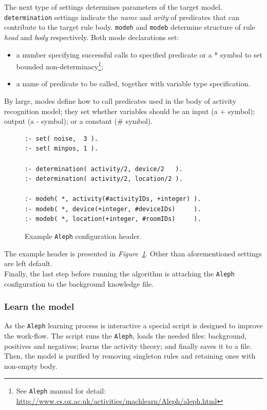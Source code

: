 \documentclass[10pt, a4paper, pdflatex, leqno, twoside, openright]{report}
\begin{document}
The next type of settings determines parameters of the target model. \texttt{determination} settings indicate the \emph{name} and \emph{arity} of predicates that can contribute to the target rule body. \texttt{modeh} and \texttt{modeb} determine structure of rule \emph{head} and \emph{body} respectively. Both mode declarations set:
\begin{itemize}
\item a number specifying successful calls to specified predicate or a * symbol to set bounded non-determinacy\footnote{See \texttt{Aleph} manual for detail: \url{http://www.cs.ox.ac.uk/activities/machlearn/Aleph/aleph.html}};
\item a name of predicate to be called, together with variable type specification.
\end{itemize}
By large, modes define how to call predicates used in the body of activity recognition model; they set whether variables should be an input (a + symbol); output (a - symbol); or a constant (\# symbol).\\

\begin{figure}[htb]
  \begin{verbatim}
:- set( noise,  3 ).
:- set( minpos, 1 ).

:- determination( activity/2, device/2   ).
:- determination( activity/2, location/2 ).

:- modeh( *, activity(#activityIDs, +integer) ).
:- modeb( *, device(+integer, #deviceIDs)     ).
:- modeb( *, location(+integer, #roomIDs)     ).
  \end{verbatim}
  \caption{Example \texttt{Aleph} configuration header.\label{lst:alephConfHead}}
\end{figure}

The example header is presented in \emph{Figure~\ref{lst:alephConfHead}}. Other than aforementioned settings are left default.\\
Finally, the last step before running the algorithm is attaching the \texttt{Aleph} configuration to the background knowledge file.

      \subsubsection{Learn the model}
As the \texttt{Aleph} learning process is interactive a special script is designed to improve the work-flow. The script runs the \texttt{Aleph}, loads the needed files: background, positives and negatives; learns the activity theory; and finally saves it to a file.\\
Then, the model is purified by removing singleton rules and retaining ones with non-empty body.\\
\end{document}
